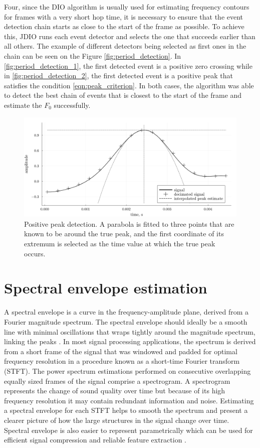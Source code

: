 \documentclass[a4paper]{article}
\begin{document}
Four, since the DIO algorithm is usually used for estimating frequency contours for frames with a very short hop time, it is necessary to ensure that the event detection chain starts as close to the start of the frame as possible. To achieve this, JDIO runs each event detector and selects the one that succeeds earlier than all others. The example of different detectors being selected as first ones in the chain can be seen on the Figure \ref{fig:period_detection}. In \ref{fig:period_detection_1}, the first detected event is a positive zero crossing while in \ref{fig:period_detection_2}, the first detected event is a positive peak that satisfies the condition \eqref{eqn:peak_criterion}. In both cases, the algorithm was able to detect the best chain of events that is closest to the start of the frame and estimate the $F_0$ successfully.

\begin{figure}
    \includegraphics{graphics/peak_detection.png}
    \caption{Positive peak detection. A parabola is fitted to three points that are known to be around the true peak, and the first coordinate of its extremum is selected as the time value at which the true peak occurs.}
    \label{fig:peak_detection}
\end{figure}

\section{Spectral envelope estimation}

A spectral envelope is a curve in the frequency-amplitude plane, derived from a Fourier magnitude spectrum. The spectral envelope should ideally be a smooth line with minimal oscillations that wraps tightly around the magnitude spectrum, linking the peaks \cite{SpectralEnvelope}. In most signal processing applications, the spectrum is derived from a short frame of the signal that was windowed and padded for optimal frequency resolution in a procedure known as a short-time Fourier transform (STFT). The power spectrum estimations performed on consecutive overlapping equally sized frames of the signal comprise a spectrogram. A spectrogram represents the change of sound quality over time but because of its high frequency resolution it may contain redundant information and noise. Estimating a spectral envelope for each STFT helps to smooth the spectrum and present a clearer picture of how the large structures in the signal change over time. Spectral envelope is also easier to represent parametrically which can be used for efficient signal compression and reliable feature extraction \cite{ParametricsApplication}.
\end{document}
